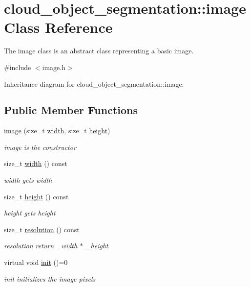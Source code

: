 \hypertarget{classcloud__object__segmentation_1_1image}{}\section{cloud\+\_\+object\+\_\+segmentation\+:\+:image Class Reference}
\label{classcloud__object__segmentation_1_1image}


The image class is an abstract class representing a basic image.  




{\ttfamily \#include $<$image.\+h$>$}



Inheritance diagram for cloud\+\_\+object\+\_\+segmentation\+:\+:image\+:
\subsection*{Public Member Functions}
\begin{DoxyCompactItemize}
\item 
\hyperlink{classcloud__object__segmentation_1_1image_aafd31509f88f78ce8cc51688462411ff}{image} (size\+\_\+t \hyperlink{classcloud__object__segmentation_1_1image_ac46913c2b63ca4d8e60f267a374429be}{width}, size\+\_\+t \hyperlink{classcloud__object__segmentation_1_1image_ad0e1ec069c7c5f8cde4cc1cd3f86ad1c}{height})
\begin{DoxyCompactList}\small\item\em image is the constructor \end{DoxyCompactList}\item 
size\+\_\+t \hyperlink{classcloud__object__segmentation_1_1image_ac46913c2b63ca4d8e60f267a374429be}{width} () const 
\begin{DoxyCompactList}\small\item\em width gets width \end{DoxyCompactList}\item 
size\+\_\+t \hyperlink{classcloud__object__segmentation_1_1image_ad0e1ec069c7c5f8cde4cc1cd3f86ad1c}{height} () const 
\begin{DoxyCompactList}\small\item\em height gets height \end{DoxyCompactList}\item 
size\+\_\+t \hyperlink{classcloud__object__segmentation_1_1image_a8236a45adb9f9801030e40e562af8a16}{resolution} () const 
\begin{DoxyCompactList}\small\item\em resolution return \+\_\+width $\ast$ \+\_\+height \end{DoxyCompactList}\item 
virtual void \hyperlink{classcloud__object__segmentation_1_1image_ac38c90d18a309eb8f497e904952220c6}{init} ()=0
\begin{DoxyCompactList}\small\item\em init initializes the image pixels \end{DoxyCompactList}\end{DoxyCompactItemize}


